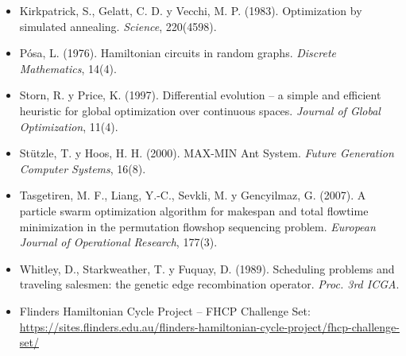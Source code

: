 \documentclass[
  spanish,
  11pt,
]{article}
\begin{document}
\begin{itemize}
\item
  Kirkpatrick, S., Gelatt, C. D. y Vecchi, M. P. (1983). Optimization by
  simulated annealing. \emph{Science}, 220(4598).
\item
  Pósa, L. (1976). Hamiltonian circuits in random graphs. \emph{Discrete
  Mathematics}, 14(4).
\item
  Storn, R. y Price, K. (1997). Differential evolution -- a simple and
  efficient heuristic for global optimization over continuous spaces.
  \emph{Journal of Global Optimization}, 11(4).
\item
  Stützle, T. y Hoos, H. H. (2000). MAX-MIN Ant System. \emph{Future
  Generation Computer Systems}, 16(8).
\item
  Tasgetiren, M. F., Liang, Y.-C., Sevkli, M. y Gencyilmaz, G. (2007). A
  particle swarm optimization algorithm for makespan and total flowtime
  minimization in the permutation flowshop sequencing problem.
  \emph{European Journal of Operational Research}, 177(3).
\item
  Whitley, D., Starkweather, T. y Fuquay, D. (1989). Scheduling problems
  and traveling salesmen: the genetic edge recombination operator.
  \emph{Proc. 3rd ICGA}.
\item
  Flinders Hamiltonian Cycle Project -- FHCP Challenge Set:
  \url{https://sites.flinders.edu.au/flinders-hamiltonian-cycle-project/fhcp-challenge-set/}
\end{itemize}
\end{document}
